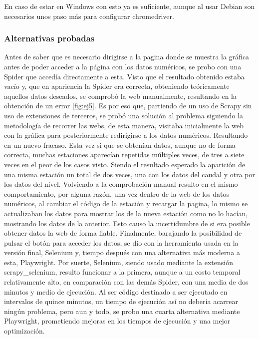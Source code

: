 En caso de estar en Windows con esto ya es suficiente, aunque al usar Debian son necesarios unos paso más para configurar chromedriver.

\subsubsection{Alternativas probadas}
Antes de saber que es necesario dirigirse a la pagina donde se muestra la gráfica antes de poder acceder a la página con los datos numéricos, se probo con una Spider que accedía directamente a esta. Visto que el resultado obtenido estaba vacío y, que en apariencia la Spider era correcta, obteniendo teóricamente aquellos datos deseados, se comprobó la web manualmente, resultando en la obtención de un error \ref{fig:ej5}.\newline
\newline
Es por eso que, partiendo de un uso de Scrapy sin uso de extensiones de terceros, se probó una solución al problema siguiendo la metodología de recorrer las webs, de esta manera, visitaba inicialmente la web con la gráfica para posteriormente redirigirse a los datos numéricos. Resultando en un nuevo fracaso. Esta vez si que se obtenían datos, aunque no de forma correcta, muchas estaciones aparecían repetidas múltiples veces, de tres a siete veces en el peor de los casos visto. Siendo el resultado esperado la aparición de una misma estación un total de dos veces, una con los datos del caudal y otra por los datos del nivel. Volviendo a la comprobación manual resulto en el mismo comportamiento, por alguna razón, una vez dentro de la web de los datos numéricos, al cambiar el código de la estación y recargar la pagina, lo mismo se actualizaban los datos para mostrar los de la nueva estación como no lo hacían, mostrando los datos de la anterior.\newline
\newline
Esto causo la incertidumbre de si era posible obtener datos la web de forma fiable. Finalmente, barajando la posibilidad de pulsar el botón para acceder los datos, se dio con la herramienta usada en la versión final, Selenium y, tiempo después con una alternativa más moderna a esta, Playwright.\newline
\newline
Por suerte, Selenium, siendo usado mediante la extensión scrapy\_selenium, resulto funcionar a la primera, aunque a un costo temporal relativamente alto, en comparación con las demás Spider, con una media de dos minutos y medio de ejecución.\newline
\newline
Al ser código destinado a ser ejecutado en intervalos de quince minutos, un tiempo de ejecución así no debería acarrear ningún problema, pero aun y todo, se probo una cuarta alternativa mediante Playwright, prometiendo mejoras en los tiempos de ejecución y una mejor optimización.\newline
\newline

